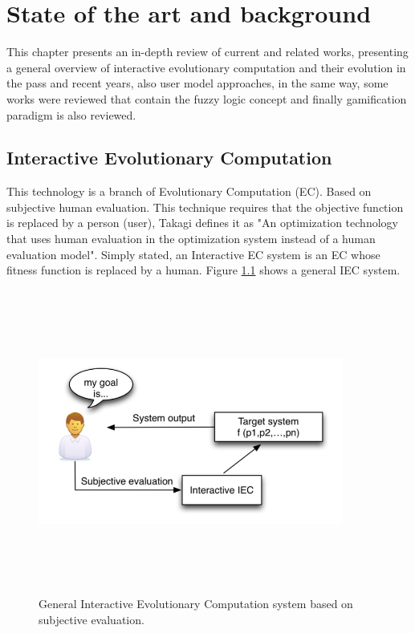 \chapter{State of the art and background} \label{}
This chapter presents an in-depth review of current and related works,
presenting a general overview of interactive evolutionary computation and their
evolution in the pass and recent years, also user model approaches, in the same
way, some works were reviewed that contain the fuzzy logic concept and finally
gamification paradigm is also reviewed.

\section{Interactive Evolutionary Computation}

This technology is a branch of Evolutionary Computation (EC). Based on
subjective human evaluation. This technique requires that the objective function
is replaced by a person (user), Takagi defines it as "An optimization technology
that uses human evaluation in the optimization system instead of a human
evaluation model"\cite{takagi1998application}. Simply stated, an Interactive EC
system is an EC whose fitness function is replaced by a human. Figure
\ref{fig:IEC} shows a general IEC system.

\begin{figure}
	\captionsetup{justification=centering,margin=2cm}
	\centering
	\setlength\fboxsep{0pt}
	\setlength\fboxrule{0.7pt}
	\includegraphics[width=10cm,height=10cm,keepaspectratio]{img/IECGeneral.png}
	\caption{ General Interactive Evolutionary Computation system based on subjective evaluation.}
	\label{fig:IEC}
\end{figure}

